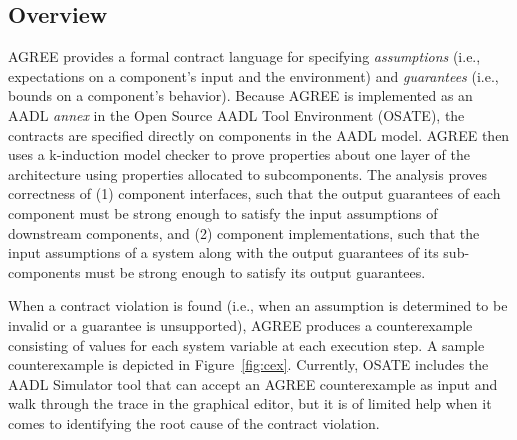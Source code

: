 \subsection{Overview}

AGREE provides a formal contract language for specifying \textit{assumptions} (i.e., expectations on a component's input and the environment) and \textit{guarantees} (i.e., bounds on a component's behavior).  Because AGREE is implemented as an AADL \textit{annex} in the Open Source AADL Tool Environment (OSATE), the contracts are specified directly on components in the AADL model.  AGREE then uses a k-induction model checker to prove properties about one layer of the architecture using properties allocated to subcomponents. The analysis proves correctness of (1) component interfaces, such that the output guarantees of each component must be strong enough to satisfy the input assumptions of downstream components, and (2) component implementations, such that the input assumptions of a system along with the output guarantees of its sub-components must be strong enough to satisfy its output guarantees.

When a contract violation is found (i.e., when an assumption is determined to be invalid or a guarantee is unsupported), AGREE produces a counterexample consisting of values for each system variable at each execution step.  A sample counterexample is depicted in Figure~\ref{fig:cex}.  Currently, OSATE includes the AADL Simulator tool that can accept an AGREE counterexample as input and walk through the trace in the graphical editor, but it is of limited help when it comes to identifying the root cause of the contract violation.


